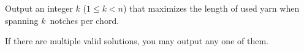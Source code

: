
    Output an integer $k$ ($1\leq k < n$) that maximizes the length of used yarn when spanning $k$~notches per chord.

    If there are multiple valid solutions, you may output any one of them.
